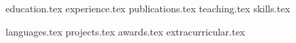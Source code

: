 \documentclass[letterpaper,11pt]{article}
\begin{document}


{education.tex}
{experience.tex}
{publications.tex}
{teaching.tex}
{skills.tex}
\pagebreak



{languages.tex}
{projects.tex}
{awards.tex}
{extracurricular.tex}
\end{document}
